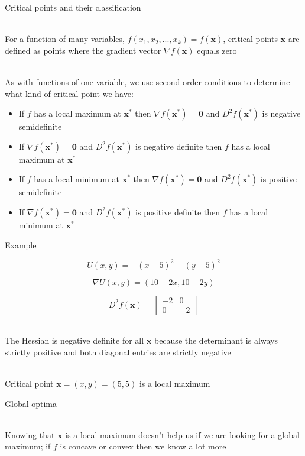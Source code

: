 \documentclass[10pt]{seminar}
\begin{document}
\begin{slide}
\newslide

Critical points and their classification

\ \\For a function of many variables, $f(x_1, x_2, ..., x_k)=f(\mathbf{x})$,  critical points $\mathbf{x}$ are defined as points where the gradient vector $\nabla f(\mathbf{x})$ equals zero

\ \\As with functions of one variable, we use second-order conditions to determine what kind of critical point we have:

\begin{itemize}
\item[1] If $f$ has a local maximum at $\mathbf{x}^*$ then $\nabla f(\mathbf{x}^*)=\mathbf{0}$ and $D^2f(\mathbf{x}^*)$ is negative semidefinite
\item[2]  If $\nabla f(\mathbf{x}^*)=\mathbf{0}$ and $D^2f(\mathbf{x}^*)$ is negative definite then $f$ has a local maximum at $\mathbf{x}^*$ 
\item[1'] If $f$ has a local minimum at $\mathbf{x}^*$ then $\nabla f(\mathbf{x}^*)=\mathbf{0}$ and $D^2f(\mathbf{x}^*)$ is positive semidefinite
\item[2'] If $\nabla f(\mathbf{x}^*)=\mathbf{0}$ and $D^2f(\mathbf{x}^*)$ is positive definite then $f$ has a local minimum at $\mathbf{x}^*$ 
\end{itemize}

\newslide
Example

 $$U(x, y)=-(x-5)^2-(y-5)^2$$
 
$$ \nabla U(x, y)=(10-2x, 10-2y)$$

$$D^2 f(\mathbf{x}) =\begin{bmatrix}
-2 & 0\\ 0& -2
\end{bmatrix}$$

\ \\The Hessian is negative definite for all $\mathbf{x}$ because the determinant is always strictly positive and both diagonal entries are strictly negative

\ \\Critical point $\mathbf{x}=(x, y)=(5,5)$ is a local maximum

\newslide

Global optima

\ \\Knowing that $\mathbf{x}$ is a local maximum doesn't help us if we are looking for a global maximum; if $f$ is concave or convex then we know a lot more


\end{slide}
\end{document}
